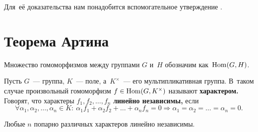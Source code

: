 \documentclass{article}
\begin{document}
Для~её доказательства нам понадобится вспомогательное утверждение \cite{Art48}.

\section{Теорема Артина}

Множество гомоморфизмов между группами $G$ и~$H$ обозначим как~$\mathrm{Hom}(G, H)$.

Пусть $G$~— группа, $K$~— поле, а~$K^{\times}$~— его мультипликативная группа.
В~таком случае произвольный гомоморфизм $f \in \mathrm{Hom}(G, K^{\times})$ называют \textbf{характером.}
Говорят, что характеры $f_1, f_2, \ldots, f_n$ \textbf{линейно независимы,}
если
$$
    \forall \alpha_1, \alpha_2, \ldots, \alpha_n \in K{:}\ \alpha_1 f_1 + \alpha_2 f_2 + \ldots + \alpha_n f_n = 0 \Rightarrow \alpha_1 = \alpha_2 = \ldots = \alpha_n = 0.
$$

\begin{theorem*}[Артин]
    Любые $n$ попарно различных характеров линейно независимы.
\end{theorem*}
\end{document}
